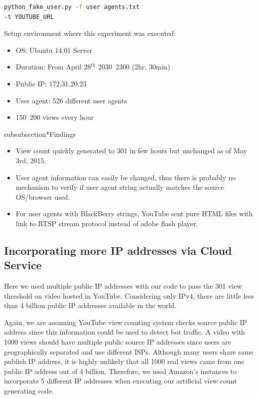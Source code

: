 \documentclass[conference]{IEEEtran}
\begin{document}
\begin{lstlisting}[frame=single, language=bash]
python fake_user.py -f user agents.txt
-t YOUTUBE_URL
\end{lstlisting}

Setup environment where this experiment was executed:
\begin{itemize}
  \setlength\itemsep{-0.1em}
  \item OS: Ubuntu 14.01 Server
  \item Duration: From April 28$^{th}$ 2030~2300 (2hr, 30min)
  \item Public IP: 172.31.20.23
  \item User agent: 526 different user agents
  \item 150~200 views every hour
\end{itemize}

subsubsection*{Findings}
\begin{itemize}
  \setlength\itemsep{-0.1em}
  \item View count quickly generated to 301 in few hours but unchanged as of May 3rd, 2015.
  \item User agent information can easily be changed, thus there is probably no mechanism to verify if user agent string actually matches the source OS/browser used.
  \item For user agents with BlackBerry strings, YouTube sent pure HTML files with link to RTSP stream protocol instead of adobe flash player.
\end{itemize}


\subsection{Incorporating more IP addresses via Cloud Service}

Here we used multiple public IP addresses with our code to pass the 301 view threshold on video hosted in YouTube. Considering only IPv4, there are little less than 4 billion public IP addresses available in the world.

Again, we are assuming YouTube view counting system checks source public IP address since this information could be used to detect bot traffic. A video with 1000 views should have multiple public source IP addresses since users are geographically separated and use different ISPs. Although many users share same publish IP address, it is highly unlikely that all 1000 real views came from one public IP address out of 4 billion. Therefore, we used Amazon’s instances to incorporate 5 different IP addresses when executing our artificial view count generating code.
\end{document}
